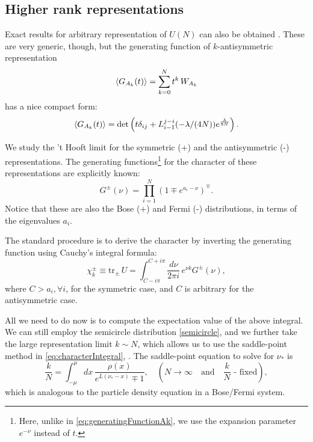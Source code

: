 

\subsection{Higher rank representations}

Exact results for arbitrary representation of $U(N)$ can also be obtained \cite{Fiol:2013hna}.
These are very generic, though, 
but the generating function of $k$-antisymmetric representation 
\begin{equation}\label{eq:generatingFunctionAk}
 \braket{G_{A_k}(t)}=\sum_{k=0}^{N} t^k \, W_{A_k}
\end{equation}
has a nice compact form:
\begin{equation}
 \braket{G_{A_k}(t)}=\text{det}\left(t \delta_{ij}+ L_{i-1}^{j-i}(-\lambda/(4N)) e^{\frac{\lambda}{8N}}\right).
\end{equation}

We study the 't Hooft limit
for the symmetric (+) and the antisymmetric (-) representations. 
The generating functions\footnote{
Here, unlike in \eqref{eq:generatingFunctionAk}, 
we use the expansion parameter $e^{-\nu}$ instead of $t$.}
for the character of these representations are explicitly known:
\begin{equation}
 G^{\pm}(\nu) = \prod_{i=1}^N (1\mp e^{a_i - \nu})^{\mp}.
\end{equation}
Notice that these are also the Bose (+) and Fermi (-) distributions, in terms of the eigenvalues $a_i$.

The standard procedure is to derive the character by inverting the generating function using Cauchy's integral formula:
\begin{equation}\label{eq:characterIntegral}
 \chi_k^\pm \equiv \text{tr}_\pm \,U = \int_{C-i\pi}^{C+i\pi} \dfrac{d\nu}{2\pi i} \, e^{\nu k} G^\pm(\nu),
\end{equation}
where $C>a_i, \forall i$, for the symmetric case, and $C$ is arbitrary for the antisymmetric case.


All we need to do now is to compute the expectation value of the above integral. 
We can still employ the semicircle distribution \eqref{semicircle}, 
and we further take the large representation limit $k \sim N$,
which allows us to use the saddle-point method in \eqref{eq:characterIntegral}, \cite{Hartnoll:2006is}.
The saddle-point equation to solve for $\nu_*$ is
\begin{equation}\label{eq:saddlePointDensity}
 \dfrac{k}{N} = \int_{-\mu}^\mu dx \, \dfrac{\rho(x)}{e^{L(\nu_*-x)}\mp 1}, 
 \quad (N\rightarrow \infty \quad \text{and} \quad \frac{k}{N} \text{ - fixed}),
\end{equation}
which is analogous to the particle density equation in a Bose/Fermi system.

